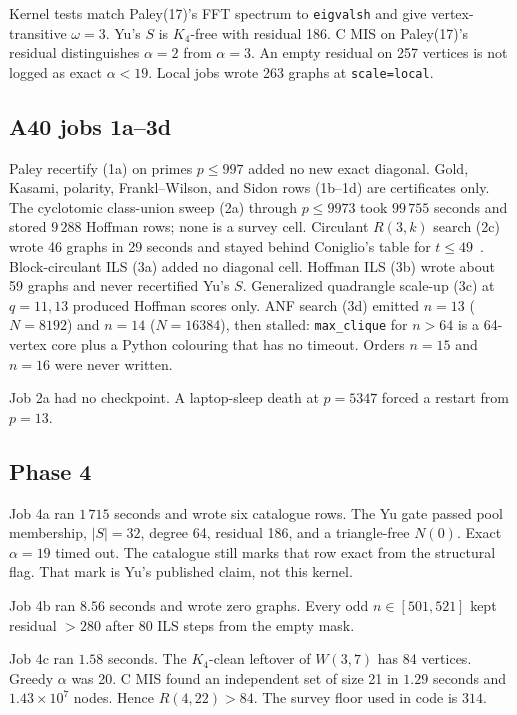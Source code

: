 \documentclass[11pt,a4paper]{article}
\begin{document}
Kernel tests match Paley(17)'s FFT spectrum to \texttt{eigvalsh} and
give vertex-transitive $\omega=3$. Yu's $S$ is $K_4$-free with residual
186. C MIS on Paley(17)'s residual distinguishes $\alpha=2$ from
$\alpha=3$. An empty residual on 257 vertices is not logged as exact
$\alpha<19$. Local jobs wrote 263 graphs at \texttt{scale=local}.

\subsection{A40 jobs 1a--3d}

Paley recertify (1a) on primes $p\le 997$ added no new exact diagonal.
Gold, Kasami, polarity, Frankl--Wilson, and Sidon rows (1b--1d) are
certificates only. The cyclotomic class-union sweep (2a) through
$p\le 9973$ took $99\,755$ seconds and stored $9\,288$ Hoffman rows;
none is a survey cell. Circulant $R(3,k)$ search (2c) wrote 46 graphs
in 29 seconds and stayed behind Coniglio's table for
$t\le 49$~\cite{coniglio}. Block-circulant ILS (3a) added no diagonal
cell. Hoffman ILS (3b) wrote about 59 graphs and never recertified
Yu's $S$. Generalized quadrangle scale-up (3c) at $q=11,13$ produced
Hoffman scores only. ANF search (3d) emitted $n=13$ ($N=8192$) and
$n=14$ ($N=16384$), then stalled: \texttt{max\_clique} for $n>64$ is
a 64-vertex core plus a Python colouring that has no timeout. Orders
$n=15$ and $n=16$ were never written.

Job 2a had no checkpoint. A laptop-sleep death at $p=5347$ forced a
restart from $p=13$.

\subsection{Phase 4}

Job 4a ran $1\,715$ seconds and wrote six catalogue rows. The Yu gate
passed pool membership, $|S|=32$, degree 64, residual 186, and a
triangle-free $N(0)$. Exact $\alpha=19$ timed out. The catalogue still
marks that row exact from the structural flag. That mark is Yu's
published claim, not this kernel.

Job 4b ran $8.56$ seconds and wrote zero graphs. Every odd
$n\in[501,521]$ kept residual $>280$ after 80 ILS steps from the empty
mask.

Job 4c ran $1.58$ seconds. The $K_4$-clean leftover of $W(3,7)$ has
84 vertices. Greedy $\alpha$ was 20. C MIS found an independent set of
size 21 in $1.29$ seconds and $1.43\times 10^7$ nodes. Hence
$R(4,22)>84$. The survey floor used in code is $314$.
\end{document}

